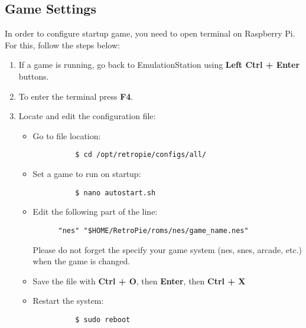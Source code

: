 \subsection{Game Settings}
\label{subsec:game_settings}

In order to configure startup game, you need to open terminal on Raspberry Pi. For this, follow the steps below:

\begin{enumerate}
  \item If a game is running, go back to EmulationStation using \textbf{Left Ctrl + Enter} buttons.
  \item To enter the terminal press \textbf{F4}.
  \item Locate and edit the configuration file:
    \begin{itemize}
      \item Go to file location:
        \begin{verbatim}
          $ cd /opt/retropie/configs/all/
        \end{verbatim}
      \item Set a game to run on startup:
        \begin{verbatim}
          $ nano autostart.sh
        \end{verbatim}
      \item Edit the following part of the line:
        \begin{verbatim}
      "nes" "$HOME/RetroPie/roms/nes/game_name.nes"
        \end{verbatim}
        Please do not forget the specify your game system (nes, snes, arcade, etc.) when the game is changed.
      \item Save the file with \textbf{Ctrl + O}, then \textbf{Enter}, then \textbf{Ctrl + X}
      \item Restart the system:
        \begin{verbatim}
          $ sudo reboot
        \end{verbatim}

    \end{itemize}
\end{enumerate}


